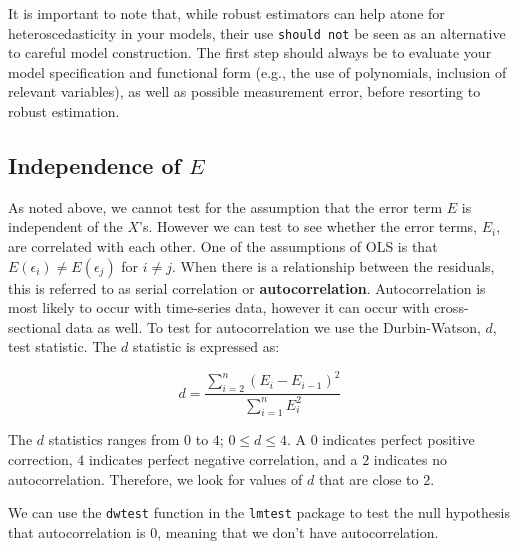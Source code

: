 \documentclass[11pt,openany]{book}\usepackage[]{graphicx}\usepackage[]{color}
\begin{document}
{It is important to note that, while robust estimators can help atone for heteroscedasticity in your models, their use \texttt{should not} be seen as an alternative to careful model construction. The first step should always be to evaluate your model specification and functional form (e.g., the use of polynomials, inclusion of relevant variables), as well as possible measurement error, before resorting to robust estimation.

\subsection{Independence of $E$} 

As noted above, we cannot test for the assumption that the error term $E$ is independent of the $X$'s.  However we can test to see whether the error terms, $E_i$, are correlated with each other. One of the assumptions of OLS is that   $E(\epsilon_i) \neq E(\epsilon_j)$ for $i \neq j$. When there is a relationship between the residuals, this is referred to as serial correlation or \textbf{autocorrelation}. Autocorrelation is most likely to occur with time-series data, however it can occur with cross-sectional data as well. To test for autocorrelation we use the Durbin-Watson, $d$, test statistic. The $d$ statistic is expressed as:

\begin{equation}
  \label{eq:dw}
  d = \frac{\sum_{i=2}^{n} (E_i-E_{i-1})^{2}}{\sum_{i=1}^{n} E^{2}_i}
\end{equation}

The $d$ statistics ranges from $0$ to $4$; $0 \leq d \leq 4$. A  $0$ indicates perfect positive correction, $4$ indicates perfect negative correlation, and a $2$ indicates no autocorrelation. Therefore, we look for values of $d$ that are close to $2$.  

We can use the \texttt{dwtest} function in the \texttt{lmtest} package to test the null hypothesis that autocorrelation is $0$, meaning that we don't have autocorrelation. 

}
\end{document}
